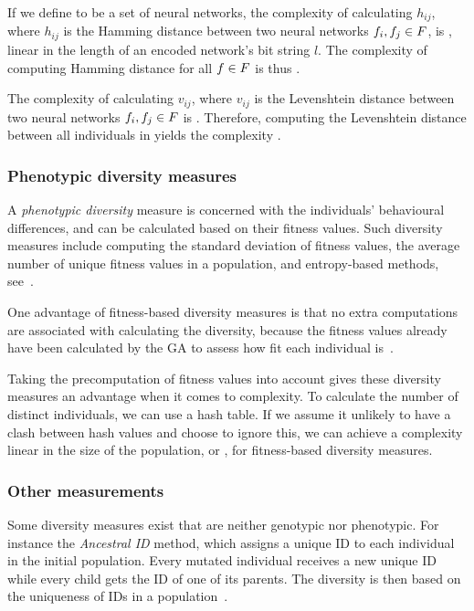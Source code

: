 If we define \indset{} to be a set of neural networks, the complexity of calculating $h_{ij}$, where $h_{ij}$ is the Hamming distance between two neural networks $f_i, f_j \in F$, is \bigO{\bitstringl}, linear in the length of an encoded network's bit string $l$. The complexity of computing Hamming distance for all $f \in F$ is thus \bigO{\indsetl^2 \cdot \bitstringl}. 

The complexity of calculating $v_{ij}$, where $v_{ij}$ is the Levenshtein distance between two neural networks $f_i, f_j \in F$ is \cite{Freeman:2006:CLN:1220835.1220895}. Therefore, computing the Levenshtein distance between all individuals in \indset{} yields the complexity .

\subsubsection{Phenotypic diversity measures}
A \emph{phenotypic diversity} measure is concerned with the individuals' behavioural differences, and can be calculated based on their fitness values. Such diversity measures include computing the standard deviation of fitness values, the average number of unique fitness values in a population, and entropy-based methods, see~\cite{1250187, 1266373}.

One advantage of fitness-based diversity measures is that no extra computations are associated with calculating the diversity, because the fitness values already have been calculated by the GA to assess how fit each individual is~\cite{Nguyen:2006:ASPGP}.

Taking the precomputation of fitness values into account gives these diversity measures an advantage when it comes to complexity. To calculate the number of distinct individuals, we can use a hash table. If we assume it unlikely to have a clash between hash values and choose to ignore this, we can achieve a complexity linear in the size of the population, or \bigO{\indsetl}, for fitness-based diversity measures.

\subsubsection{Other measurements}
Some diversity measures exist that are neither genotypic nor phenotypic. For instance the \emph{Ancestral ID} method, which assigns a unique ID to each individual in the initial population. Every mutated individual receives a new unique ID while every child gets the ID of one of its parents. The diversity is then based on the uniqueness of IDs in a population~\cite{1250187}.
